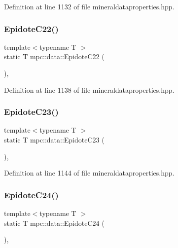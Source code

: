 Definition at line 1132 of file mineraldataproperties.\+hpp.

\mbox{\label{namespacempc_1_1data_a9295968c9145b32c656ebd8809569f30}} 
\subsubsection{\texorpdfstring{Epidote\+C22()}{EpidoteC22()}}
{\footnotesize\ttfamily template$<$typename T $>$ \\
static T mpc\+::data\+::\+Epidote\+C22 (\begin{DoxyParamCaption}{ }\end{DoxyParamCaption})\hspace{0.3cm}{\ttfamily [inline]}, {\ttfamily [static]}}



Definition at line 1138 of file mineraldataproperties.\+hpp.

\mbox{\label{namespacempc_1_1data_aadc3457fd822a04dfaec53019ec1f3c4}} 
\subsubsection{\texorpdfstring{Epidote\+C23()}{EpidoteC23()}}
{\footnotesize\ttfamily template$<$typename T $>$ \\
static T mpc\+::data\+::\+Epidote\+C23 (\begin{DoxyParamCaption}{ }\end{DoxyParamCaption})\hspace{0.3cm}{\ttfamily [inline]}, {\ttfamily [static]}}



Definition at line 1144 of file mineraldataproperties.\+hpp.

\mbox{\label{namespacempc_1_1data_ae1781b55f53a8853226d8f1c21f30965}} 
\subsubsection{\texorpdfstring{Epidote\+C24()}{EpidoteC24()}}
{\footnotesize\ttfamily template$<$typename T $>$ \\
static T mpc\+::data\+::\+Epidote\+C24 (\begin{DoxyParamCaption}{ }\end{DoxyParamCaption})\hspace{0.3cm}{\ttfamily [inline]}, {\ttfamily [static]}}




